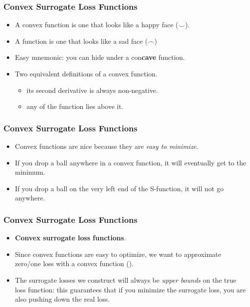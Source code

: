 \documentclass[trans]{beamer}
\begin{document}
\begin{frame}
  \frametitle{Convex Surrogate Loss Functions}
\begin{itemize}
\item 
A convex function is one that looks
like a happy face ($\smile$).
\item A 
function is one that looks like a sad face ($\frown$)
\item Easy
mnemonic:  you can hide under a con{\bf cave} function.
\item Two equivalent definitions of a convex function. 
\begin{itemize}
\item its second derivative is always non-negative.  
\item any  of the function lies
above it.
\end{itemize}
\end{itemize}
\end{frame}

\begin{frame}
  \frametitle{Convex Surrogate Loss Functions}
\begin{itemize}
\item 
Convex functions are nice because they are \emph{easy to minimize}.
\item If you drop a ball anywhere in a convex function, it will
eventually get to the minimum.  
\item If you drop a ball on the very left end of
the S-function, it will not
go anywhere.
\end{itemize}
\end{frame}

\begin{frame}
  \frametitle{Convex Surrogate Loss Functions}
\begin{itemize}
\item  {\bf Convex surrogate loss functions}.
\item Since convex functions are easy to optimize,
we want to approximate zero/one loss with a convex function ().
\item  The
surrogate losses we construct will always be \emph{upper bounds} on
the true loss function: this guarantees that if you minimize the
surrogate loss, you are also pushing down the real loss.
\end{itemize}
\end{frame}
\end{document}

